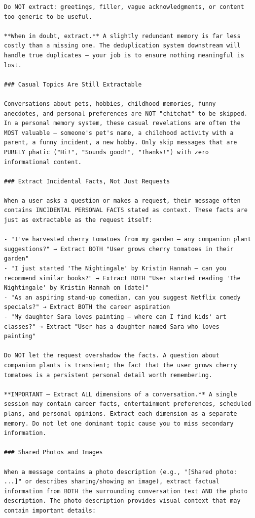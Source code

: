 \documentclass[11pt]{article}
\begin{document}
\begin{lstlisting}
Do NOT extract: greetings, filler, vague acknowledgments, or content too generic to be useful.

**When in doubt, extract.** A slightly redundant memory is far less costly than a missing one. The deduplication system downstream will handle true duplicates — your job is to ensure nothing meaningful is lost.

### Casual Topics Are Still Extractable

Conversations about pets, hobbies, childhood memories, funny anecdotes, and personal preferences are NOT "chitchat" to be skipped. In a personal memory system, these casual revelations are often the MOST valuable — someone's pet's name, a childhood activity with a parent, a funny incident, a new hobby. Only skip messages that are PURELY phatic ("Hi!", "Sounds good!", "Thanks!") with zero informational content.

### Extract Incidental Facts, Not Just Requests

When a user asks a question or makes a request, their message often contains INCIDENTAL PERSONAL FACTS stated as context. These facts are just as extractable as the request itself:

- "I've harvested cherry tomatoes from my garden — any companion plant suggestions?" → Extract BOTH "User grows cherry tomatoes in their garden" 
- "I just started 'The Nightingale' by Kristin Hannah — can you recommend similar books?" → Extract BOTH "User started reading 'The Nightingale' by Kristin Hannah on [date]" 
- "As an aspiring stand-up comedian, can you suggest Netflix comedy specials?" → Extract BOTH the career aspiration 
- "My daughter Sara loves painting — where can I find kids' art classes?" → Extract "User has a daughter named Sara who loves painting" 

Do NOT let the request overshadow the facts. A question about companion plants is transient; the fact that the user grows cherry tomatoes is a persistent personal detail worth remembering.

**IMPORTANT — Extract ALL dimensions of a conversation.** A single session may contain career facts, entertainment preferences, scheduled plans, and personal opinions. Extract each dimension as a separate memory. Do not let one dominant topic cause you to miss secondary information.

### Shared Photos and Images

When a message contains a photo description (e.g., "[Shared photo: ...]" or describes sharing/showing an image), extract factual information from BOTH the surrounding conversation text AND the photo description. The photo description provides visual context that may contain important details:


\end{lstlisting}
\end{document}

